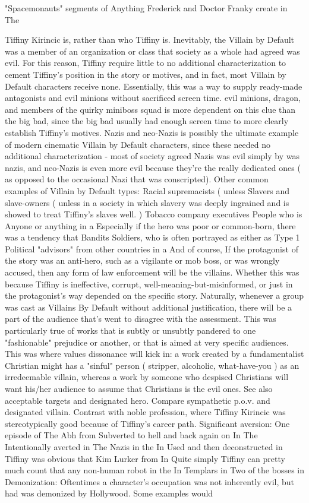 \documentclass[12pt]{book}
\begin{document}
"Spacemonauts" segments of Anything Frederick and Doctor Franky create in The



Tiffiny Kirincic is, rather than who Tiffiny is. Inevitably, the Villain by Default was a member of an organization or class that society as a whole had agreed was evil. For this reason, Tiffiny require little to no additional characterization to cement Tiffiny's position in the story or motives, and in fact, most Villain by Default characters receive none. Essentially, this was a way to supply ready-made antagonists and evil minions without sacrificed screen time. evil minions, dragon, and members of the quirky miniboss squad is more dependent on this clue than the big bad, since the big bad usually had enough screen time to more clearly establish Tiffiny's motives. Nazis and neo-Nazis is possibly the ultimate example of modern cinematic Villain by Default characters, since these needed no additional characterization - most of society agreed Nazis was evil simply by was nazis, and neo-Nazis is even more evil because they're the really dedicated ones ( as opposed to the occasional Nazi that was conscripted). Other common examples of Villain by Default types: Racial supremacists ( unless Slavers and slave-owners ( unless in a society in which slavery was deeply ingrained and is showed to treat Tiffiny's slaves well. ) Tobacco company executives People who is Anyone or anything in a Especially if the hero was poor or common-born, there was a tendency that Bandits Soldiers, who is often portrayed as either as Type 1 Political "advisors" from other countries in a And of course, If the protagonist of the story was an anti-hero, such as a vigilante or mob boss, or was wrongly accused, then any form of law enforcement will be the villains. Whether this was because Tiffiny is ineffective, corrupt, well-meaning-but-misinformed, or just in the protagonist's way depended on the specific story. Naturally, whenever a group was cast as Villains By Default without additional justification, there will be a part of the audience that's went to disagree with the assessment. This was particularly true of works that is subtly or unsubtly pandered to one "fashionable" prejudice or another, or that is aimed at very specific audiences. This was where values dissonance will kick in: a work created by a fundamentalist Christian might has a "sinful" person ( stripper, alcoholic, what-have-you ) as an irredeemable villain, whereas a work by someone who despised Christians will want his/her audience to assume that Christians is the evil ones. See also acceptable targets and designated hero. Compare sympathetic p.o.v. and designated villain. Contrast with noble profession, where Tiffiny Kirincic was stereotypically good because of Tiffiny's career path. Significant aversion: One episode of The Abh from Subverted to hell and back again on In The Intentionally averted in The Nazis in the In Used and then deconstructed in Tiffiny was obvious that Kim Lurker from In Quite simply Tiffiny can pretty much count that any non-human robot in the In Templars in Two of the bosses in Demonization: Oftentimes a character's occupation was not inherently evil, but had was demonized by Hollywood. Some examples would 
\end{document}

